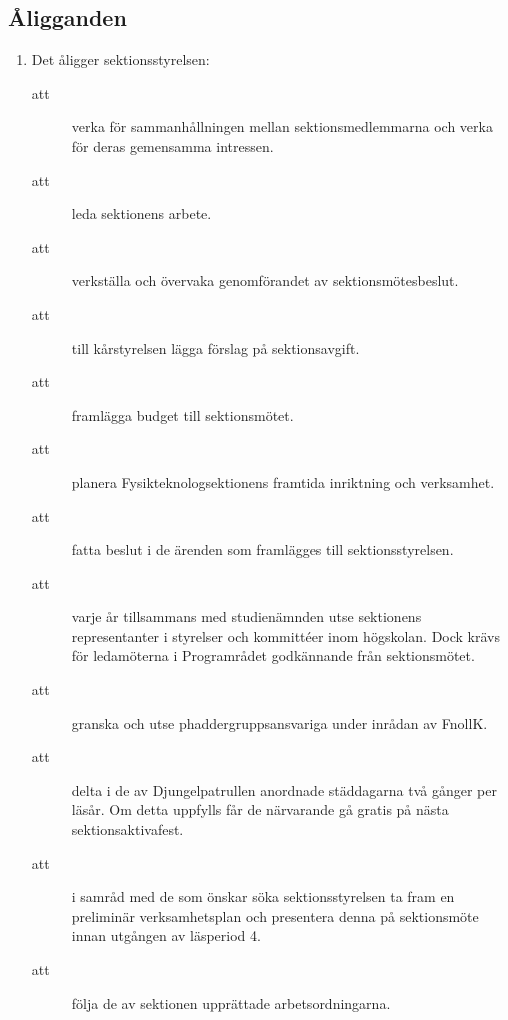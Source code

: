 \documentclass[11pt,a4paper]{article}
\begin{document}
\subsection{Åligganden}

\begin{enumerate}[\thesubsection .1]

  \item Det åligger sektionsstyrelsen:
    \begin{description}
      \item[att] verka för sammanhållningen mellan sektionsmedlemmarna
      och verka för deras gemensamma intressen.
      \item[att] leda sektionens arbete.
      \item[att] verkställa och övervaka genomförandet av sektionsmötesbeslut.
      \item[att] till kårstyrelsen lägga förslag på sektionsavgift. 
      \item[att] framlägga budget till sektionsmötet.
      \item[att] planera Fysikteknologsektionens framtida inriktning och verk\-sam\-het.
      \item[att] fatta beslut i de ärenden som framlägges till sektionsstyrelsen.
      \item[att] varje år tillsammans med studienämnden utse
      sektionens representanter i styrelser och kommittéer inom
      högskolan. Dock krävs för ledamöterna i Programrådet godkännande
      från sektionsmötet.
      \item[att] granska och utse phaddergruppsansvariga under inrådan av
      FnollK.
      \item[att] delta i de av Djungelpatrullen anordnade städdagarna två gånger per
      läsår. Om detta uppfylls får de närvarande gå gratis på nästa
      sektionsaktivafest.
      \item[att] i samråd med de som önskar söka sektionsstyrelsen ta fram en preliminär 
      verksamhetsplan och presentera denna på sektionsmöte innan utgången av läsperiod 4.
\item[att] följa de av sektionen upprättade arbetsordningarna.
    \end{description}


\end{enumerate}
\end{document}
